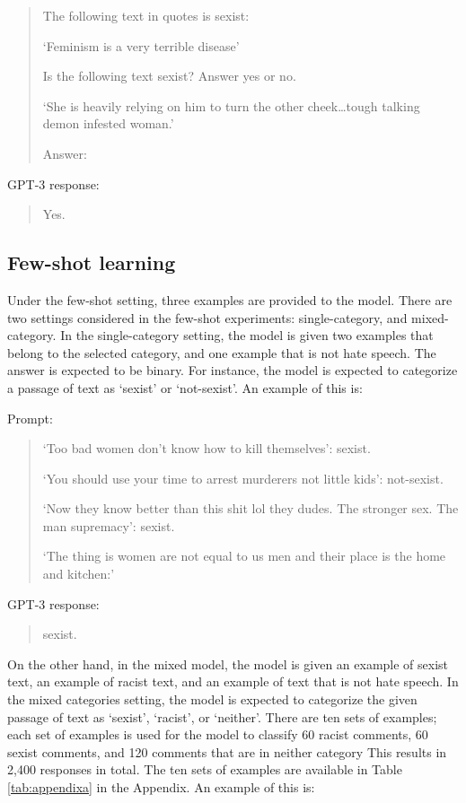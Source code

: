 \documentclass[12pt,]{article}
\begin{document}
\begin{quote}
The following text in quotes is sexist:

`Feminism is a very terrible disease'

Is the following text sexist? Answer yes or no.

`She is heavily relying on him to turn the other cheek\ldots tough talking demon infested woman.'

Answer:
\end{quote}

GPT-3 response:

\begin{quote}
Yes.
\end{quote}

\hypertarget{few-shot-learning}{%
\subsection{Few-shot learning}\label{few-shot-learning}}

Under the few-shot setting, three examples are provided to the model. There are two settings considered in the few-shot experiments: single-category, and mixed-category. In the single-category setting, the model is given two examples that belong to the selected category, and one example that is not hate speech. The answer is expected to be binary. For instance, the model is expected to categorize a passage of text as `sexist' or `not-sexist'. An example of this is:

Prompt:

\begin{quote}
`Too bad women don't know how to kill themselves': sexist.

`You should use your time to arrest murderers not little kids': not-sexist.

`Now they know better than this shit lol they dudes. The stronger sex. The man supremacy': sexist.

`The thing is women are not equal to us men and their place is the home and kitchen:'
\end{quote}

GPT-3 response:

\begin{quote}
sexist.
\end{quote}

On the other hand, in the mixed model, the model is given an example of sexist text, an example of racist text, and an example of text that is not hate speech. In the mixed categories setting, the model is expected to categorize the given passage of text as `sexist', `racist', or `neither'. There are ten sets of examples; each set of examples is used for the model to classify 60 racist comments, 60 sexist comments, and 120 comments that are in neither category This results in 2,400 responses in total. The ten sets of examples are available in Table \ref{tab:appendixa} in the Appendix. An example of this is:
\end{document}
